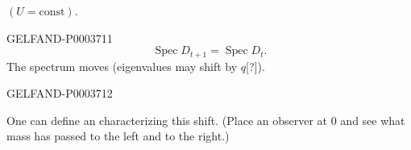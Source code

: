 $(U=\mathrm{const})$.


\begin{GelfandAdjacentEvidence}{GELFAND-P000371}{1}
\begin{equation*}\operatorname{Spec}D_{t+1}=\operatorname{Spec}D_t.\end{equation*}
The spectrum moves (eigenvalues may shift by $q$[?]).
\end{GelfandAdjacentEvidence}
\begin{GelfandAdjacentEvidence}{GELFAND-P000371}{2}

One can define an  characterizing this shift.
(Place an observer at $0$ and see what mass has passed to the left and to the right.)




\end{GelfandAdjacentEvidence}
